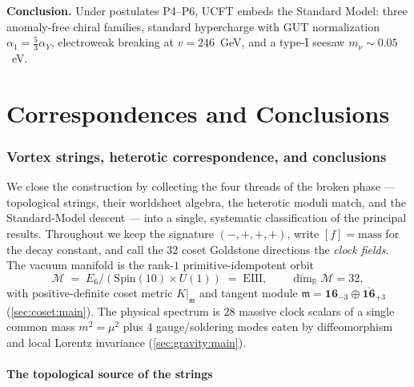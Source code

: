\documentclass[11pt]{article}
\theoremstyle{plain}
\theoremstyle{definition}
\theoremstyle{remark}
\begin{document}
\noindent\textbf{Conclusion.} Under postulates P4--P6, UCFT embeds the Standard
Model: three anomaly-free chiral families, standard hypercharge with GUT
normalization $\alpha_1=\tfrac53\alpha_Y$, electroweak breaking at $v=246$~GeV, and a
type-I seesaw $m_\nu\sim0.05$~eV.
\part{Correspondences and Conclusions}
\section{Vortex strings, heterotic correspondence, and conclusions}
\label{sec:strings:main}

We close the construction by collecting the four threads of the broken
phase --- topological strings, their worldsheet algebra, the heterotic
moduli match, and the Standard-Model descent --- into a single,
systematic classification of the principal results. Throughout we
keep the signature $(-,+,+,+)$, write $[f]=\text{mass}$ for the decay
constant, and call the $32$ coset Goldstone directions the \emph{clock
fields}. The vacuum manifold is the rank-$1$ primitive-idempotent orbit
\begin{equation}
  \mathcal{M} \;=\; E_{6}/(\mathrm{Spin}(10)\times U(1)) \;=\; \mathrm{EIII},
  \qquad \dim_{\mathbb{R}}\mathcal{M}=32,
  \label{eq:strings:vacuum}
\end{equation}
with positive-definite coset metric $K|_{\mathfrak m}$ and tangent module
$\mathfrak m = \mathbf{16}_{-3}\oplus\overline{\mathbf{16}}_{+3}$
(\autoref{sec:coset:main}). The physical spectrum is $28$ massive clock
scalars of a single common mass $m^{2}=\mu^{2}$ plus $4$ gauge/soldering
modes eaten by diffeomorphism and local Lorentz invariance
(\autoref{sec:gravity:main}).

\subsection{The topological source of the strings}
\label{sec:strings:topology}
\end{document}
